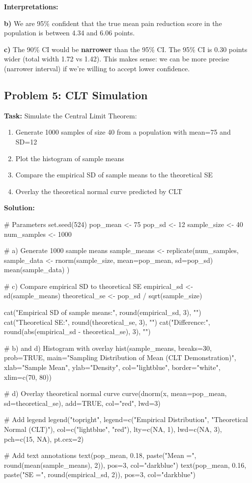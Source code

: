 \documentclass[11pt]{article}
\begin{document}
\textcolor{correctgreen}{\textbf{Interpretations:}}

\textbf{b)} We are 95\% confident that the true mean pain reduction score in the population is between 4.34 and 6.06 points.

\textbf{c)} The 90\% CI would be \textbf{narrower} than the 95\% CI. The 95\% CI is 0.30 points wider (total width 1.72 vs 1.42). This makes sense: we can be more precise (narrower interval) if we're willing to accept lower confidence.

\subsection{Problem 5: CLT Simulation}

\textbf{Task:} Simulate the Central Limit Theorem:
\begin{enumerate}[label=\alph*)]
\item Generate 1000 samples of size 40 from a population with mean=75 and SD=12
\item Plot the histogram of sample means
\item Compare the empirical SD of sample means to the theoretical SE
\item Overlay the theoretical normal curve predicted by CLT
\end{enumerate}

\textbf{Solution:}

\begin{rcode}
# Parameters
set.seed(524)
pop_mean <- 75
pop_sd <- 12
sample_size <- 40
num_samples <- 1000

# a) Generate 1000 sample means
sample_means <- replicate(num_samples, {
  sample_data <- rnorm(sample_size, mean=pop_mean, sd=pop_sd)
  mean(sample_data)
})

# c) Compare empirical SD to theoretical SE
empirical_sd <- sd(sample_means)
theoretical_se <- pop_sd / sqrt(sample_size)

cat("Empirical SD of sample means:", round(empirical_sd, 3), "\n")
cat("Theoretical SE:", round(theoretical_se, 3), "\n")
cat("Difference:", round(abs(empirical_sd - theoretical_se), 3), "\n\n")

# b) and d) Histogram with overlay
hist(sample_means, breaks=30, prob=TRUE,
     main="Sampling Distribution of Mean (CLT Demonstration)",
     xlab="Sample Mean",
     ylab="Density",
     col="lightblue",
     border="white",
     xlim=c(70, 80))

# d) Overlay theoretical normal curve
curve(dnorm(x, mean=pop_mean, sd=theoretical_se),
      add=TRUE, col="red", lwd=3)

# Add legend
legend("topright",
       legend=c("Empirical Distribution", "Theoretical Normal (CLT)"),
       col=c("lightblue", "red"),
       lty=c(NA, 1),
       lwd=c(NA, 3),
       pch=c(15, NA),
       pt.cex=2)

# Add text annotations
text(pop_mean, 0.18, paste("Mean =", round(mean(sample_means), 2)),
     pos=3, col="darkblue")
text(pop_mean, 0.16, paste("SE =", round(empirical_sd, 2)),
     pos=3, col="darkblue")
\end{rcode}
\end{document}
